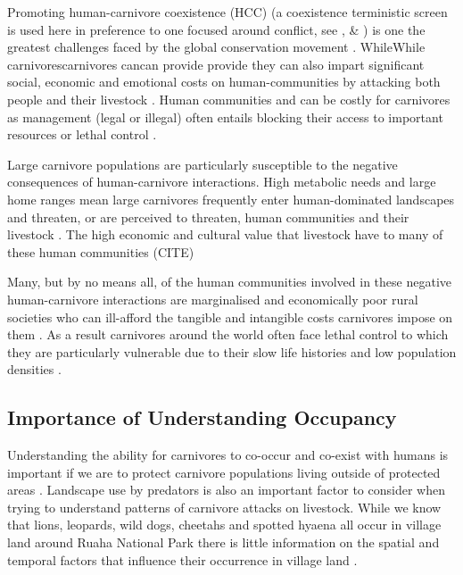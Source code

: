Promoting human-carnivore coexistence (HCC) (a coexistence terministic screen is  used here in preference to one focused around conflict, see \cite{MADDEN_2004}, \citet{Peterson_2010} \& \citet{Redpath_2014}) is one the greatest challenges faced by the global conservation movement \cite{Dickman_2010,Redpath2014}. WhileWhile carnivorescarnivores cancan provide provide  they can also impart significant social, economic and emotional costs on human-communities by attacking both people and their livestock \cite{Barua_2013,Gogoi_2018}. Human communities  and can be costly for carnivores as management (legal or illegal) often entails blocking their access to important resources or lethal control \cite{Treves,Baruch_Mordo_2013,Dickman_2010}.

Large carnivore populations are particularly susceptible to the negative consequences of human-carnivore interactions. High metabolic needs \cite{carbone1999energetic} and large home ranges \cite{Ripple_2014} mean large carnivores frequently enter human-dominated landscapes and threaten, or are perceived to threaten, human communities and their livestock \cite{Ripple_2014,Dickman_2014}. The high economic and cultural value that livestock have to many of these human communities (CITE)


Many, but by no means all, of the human communities involved in these negative human-carnivore interactions are marginalised and economically poor rural societies who can ill-afford the tangible and intangible costs carnivores impose on them \cite{Dickman_2014,Ripple_2014,Kansky_2014}. As a result carnivores around the world often face lethal control \cite{Thirgood2005} to which they are particularly vulnerable due to their slow life histories and low population densities \citep{woodroffe2005,Bodmer_1997,Cardillo_2004}.

\subsection{Importance of Understanding Occupancy}

Understanding the ability for carnivores to co-occur and co-exist with humans is important if we are to protect carnivore populations living outside of protected areas \citep{woodroffe2005,Dickman_2014,Ripple_2014}. Landscape use by predators is also an important factor to consider when trying to understand patterns of carnivore attacks on livestock. While we know that lions, leopards, wild dogs, cheetahs and spotted hyaena all occur in village land around Ruaha National Park \cite{Abade_2014,dickman2008} there is little information on the spatial and temporal factors that influence their occurrence in village land \cite{Abade2014a}.\\


